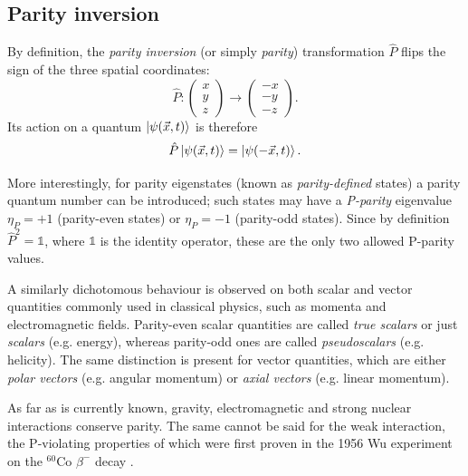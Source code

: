 \subsection{Parity inversion}
By definition, the \textit{parity inversion} (or simply \textit{parity}) transformation $\hat{P}$ flips the sign of the three spatial coordinates:
\begin{equation}
	\hat{P} : \begin{pmatrix}
		x \\ y \\ z
	\end{pmatrix}
	\rightarrow
	\begin{pmatrix}
		-x \\ -y \\ -z
	\end{pmatrix}.
\end{equation}
Its action on a quantum $\ket{\psi(\vec{x},t)}$ is therefore
\begin{equation}
	\hat{P} \ket{\psi(\vec{x},t)} = \ket{\psi(-\vec{x},t)}.
\end{equation}

More interestingly, for parity eigenstates (known as \textit{parity-defined} states) a parity quantum number can be introduced;
such states may have a \textit{P-parity} eigenvalue $\eta_P = +1$ (parity-even states) or $\eta_P = -1$ (parity-odd states).
Since by definition $\hat{P}^2 = \mathds{1}$, where $\mathds{1}$ is the identity operator, these are the only two allowed P-parity values.

A similarly dichotomous behaviour is observed on both scalar and vector quantities commonly used in classical physics, such as momenta and electromagnetic fields.
Parity-even scalar quantities are called \textit{true scalars} or just \textit{scalars} (e.g. energy), whereas parity-odd ones are called \textit{pseudoscalars} (e.g. helicity).
The same distinction is present for vector quantities, which are either \textit{polar vectors} (e.g. angular momentum) or \textit{axial vectors} (e.g. linear momentum).

As far as is currently known, gravity, electromagnetic and strong nuclear interactions conserve parity.
The same cannot be said for the weak interaction, the P-violating properties of which were first proven in the 1956 Wu experiment on the $^{60}\text{Co}$ $\beta^-$ decay \cite{wu}. 

